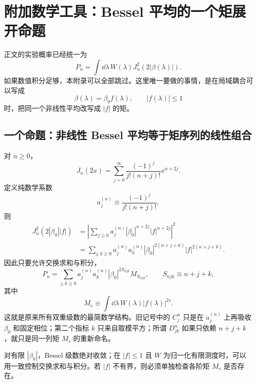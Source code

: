 \chapter{附加数学工具：Bessel 平均的一个矩展开命题}
\label{app:analytic-series}

正文的实验概率已经统一为
\begin{equation}
P_n
=\int\dd\lambda\,W(\lambda)
J_n^2\!\left(2|\beta(\lambda)|\right).
\label{eq:analytic-series-master}
\end{equation}
如果数值积分足够，本附录可以全部跳过。这里唯一要做的事情，是在局域耦合可以写成
\begin{equation}
\beta(\lambda)=\beta_0f(\lambda),
\qquad |f(\lambda)|\le1
\end{equation}
时，把同一个非线性平均改写成 \(|f|\) 的矩。

\section{一个命题：非线性 Bessel 平均等于矩序列的线性组合}

对 \(n\ge0\)，
\begin{equation}
J_n(2x)
=\sum_{j=0}^{\infty}
\frac{(-1)^j}{j!(n+j)!}x^{n+2j}.
\label{eq:Bessel-series-definition}
\end{equation}
定义纯数学系数
\begin{equation}
 a_j^{(n)}\equiv\frac{(-1)^j}{j!(n+j)!},
\end{equation}
则
\begin{align}
J_n^2\!\left(2|\beta_0||f|\right)
&=\left|\sum_{j\ge0}a_j^{(n)}|\beta_0|^{n+2j}|f|^{n+2j}\right|^2\\
&=\sum_{j,k\ge0}
a_j^{(n)}a_k^{(n)}
|\beta_0|^{2(n+j+k)}|f|^{2(n+j+k)}.
\end{align}
因此只要允许交换求和与积分，
\begin{equation}
\boxed{
P_n
=\sum_{j,k\ge0}
a_j^{(n)}a_k^{(n)}
|\beta_0|^{2S_{njk}}M_{S_{njk}},
\qquad
S_{njk}\equiv n+j+k,}
\label{eq:moment-expansion-master}
\end{equation}
其中
\begin{equation}
\boxed{
M_s\equiv\int\dd\lambda\,W(\lambda)|f(\lambda)|^{2s}.}
\label{eq:moment-definition}
\end{equation}
这就是原来所有双重级数的最简数学结构。旧记号中的 \(C_j^n\) 只是在 \(a_j^{(n)}\) 上再吸收 \(\beta_0\) 和固定相位；第二个指标 \(k\) 只来自取模平方；所谓 \(D_{jk}^n\) 如果只依赖 \(n+j+k\)，就只是同一列矩 \(M_s\) 的重新命名。

对有限 \(|\beta_0|\)，Bessel 级数绝对收敛；在 \(|f|\le1\) 且 \(W\) 为归一化有限测度时，可以用一致控制交换求和与积分。若 \(|f|\) 不有界，则必须单独检查各阶矩 \(M_s\) 是否存在。

